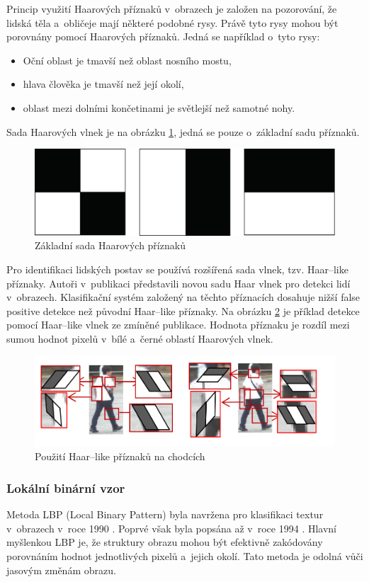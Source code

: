 Princip využití Haarových příznaků v~obrazech je založen na pozorování, že lidská těla a~obličeje mají některé podobné rysy. Právě tyto rysy mohou být porovnány pomocí Haarových příznaků. Jedná se například o~tyto rysy:
\begin{itemize}
  \item{Oční oblast je tmavší než oblast nosního mostu,}
  \item{hlava člověka je tmavší než její okolí,}
  \item{oblast mezi dolními končetinami je světlejší než samotné nohy.}
\end{itemize}
Sada Haarových vlnek je na obrázku \ref{fig:basichaarfeatures}, jedná se pouze o~základní sadu příznaků.
\begin{figure}[H]
\centering
\includegraphics[width=.7\linewidth]{figures/haar_features}
\caption{Základní sada Haarových příznaků}
\label{fig:basichaarfeatures}
\end{figure}

Pro identifikaci lidských postav se používá rozšířená sada vlnek, tzv. Haar--like příznaky. Autoři v~publikaci \cite{haar:like} představili novou sadu Haar vlnek pro detekci lidí v~obrazech. Klasifikační systém založený na těchto příznacích dosahuje nižší false positive detekce než původní Haar--like příznaky.  Na obrázku \ref{fig:haarlike} je příklad detekce pomocí Haar--like vlnek ze zmíněné publikace. Hodnota příznaku je rozdíl mezi sumou hodnot pixelů v~bílé a~černé oblastí Haarových vlnek.
\begin{figure}[H]
\centering
\includegraphics[width=.8\linewidth]{figures/haar-like}
\caption{Použití Haar--like příznaků na chodcích \cite{haar:like}}
\label{fig:haarlike}
\end{figure}

\subsubsection*{Lokální binární vzor}
Metoda LBP (Local Binary Pattern) byla navržena pro klasifikaci textur v~obrazech v~roce 1990 \cite{lbp:texture}. Poprvé však byla popsána až v~roce 1994 \cite{lbp:first}. Hlavní myšlenkou LBP je, že struktury obrazu mohou být efektivně zakódovány porovnáním hodnot jednotlivých pixelů a~jejich okolí. Tato metoda je odolná vůči jasovým změnám obrazu.

